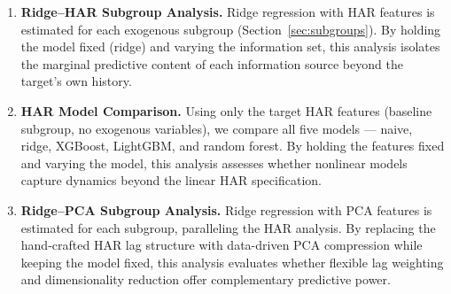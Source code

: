 \begin{enumerate}
    \item \textbf{Ridge--HAR Subgroup Analysis.} Ridge regression with HAR features is estimated for each exogenous subgroup (Section~\ref{sec:subgroups}). By holding the model fixed (ridge) and varying the information set, this analysis isolates the marginal predictive content of each information source beyond the target's own history.

    \item \textbf{HAR Model Comparison.} Using only the target HAR features (baseline subgroup, no exogenous variables), we compare all five models --- naive, ridge, XGBoost, LightGBM, and random forest. By holding the features fixed and varying the model, this analysis assesses whether nonlinear models capture dynamics beyond the linear HAR specification.

    \item \textbf{Ridge--PCA Subgroup Analysis.} Ridge regression with PCA features is estimated for each subgroup, paralleling the HAR analysis. By replacing the hand-crafted HAR lag structure with data-driven PCA compression while keeping the model fixed, this analysis evaluates whether flexible lag weighting and dimensionality reduction offer complementary predictive power.
\end{enumerate}
